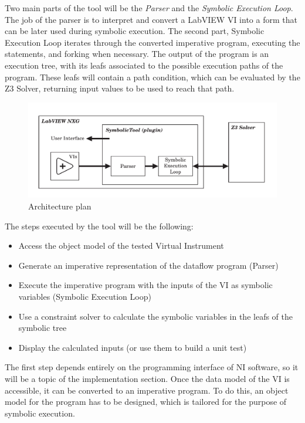 Two main parts of the tool will be the \emph{Parser} and the \emph{Symbolic Execution Loop}. The job of the parser is to interpret and convert a LabVIEW VI into a form that can be later used during symbolic execution. The second part, Symbolic Execution Loop iterates through the converted imperative program, executing the statements, and forking when necessary. The output of the program is an execution tree, with its leafs associated to the possible execution paths of the program. These leafs will contain a path condition, which can be evaluated by the Z3 Solver, returning input values to be used to reach that path.
\begin{figure}
\includegraphics[width=150mm,keepaspectratio]{figures/architecture.pdf}
\caption{Architecture plan} 
\label{fig:architectureplan}
\end{figure}


The steps executed by the tool will be the following:

\begin{itemize}
  \item Access the object model of the tested Virtual Instrument
  \item Generate an imperative representation of the dataflow program (Parser)
  \item Execute the imperative program with the inputs of the VI as symbolic variables (Symbolic Execution Loop)
   \item Use a constraint solver to calculate the symbolic variables
in the leafs of the symbolic tree
     \item Display the calculated inputs (or use them to build a unit test)
  \end{itemize}

The first step depends entirely on the programming interface of NI software, so it will be a topic of the implementation section. Once the data model of the VI is accessible, it can be converted to an imperative program. To do this, an object model for the program has to be designed, which is tailored for the purpose of symbolic execution.

